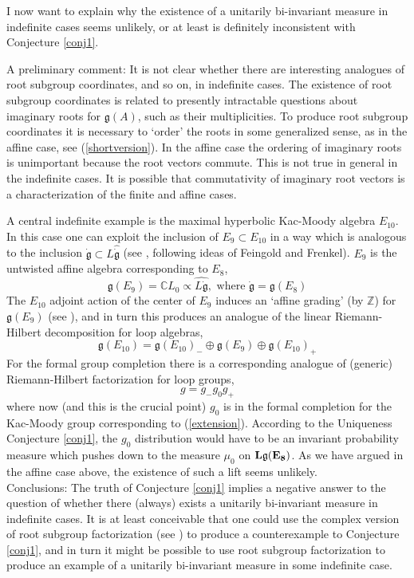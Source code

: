 \documentclass{amsart}
\theoremstyle{conjecture}
\theoremstyle{definition}
\theoremstyle{question}
\theoremstyle{questions}
\theoremstyle{remark}
\theoremstyle{remarks}
\theoremstyle{example}
\numberwithin{equation}{section}
\begin{document}
I now want to explain why the existence of a unitarily bi-invariant measure in indefinite cases seems unlikely, or at least is definitely inconsistent with Conjecture \ref{conj1}.

A preliminary comment: It is not clear whether there are interesting analogues of root subgroup coordinates, and so on, in indefinite cases. The existence of root subgroup coordinates is related to presently intractable questions about imaginary roots for $\mathfrak g(A)$, such as their multiplicities. To produce root subgroup coordinates it is necessary to `order' the roots in some generalized sense, as in the affine case, see (\ref{shortversion}). In the affine case the ordering of imaginary roots is unimportant because the root vectors commute. This is not true in general in the indefinite cases. It is possible that commutativity of imaginary root vectors is a characterization of the finite and affine cases.

A central indefinite example is the maximal hyperbolic Kac-Moody algebra $E_{10}$. In this case one can exploit the inclusion of $E_9 \subset E_{10}$
in a way which is analogous to the inclusion $\dot{\mathfrak g} \subset L\widehat{\dot{\mathfrak g}}$ (see \cite{KMW}, following ideas of Feingold and Frenkel). $E_9$ is
the untwisted affine algebra corresponding to $E_8$,
\begin{equation}\label{extension}\mathfrak g(E_9)=\mathbb CL_0 \propto \widehat{L\dot{ \mathfrak g}},\text{ where } \dot {\mathfrak g}=\mathfrak g(E_8) \end{equation}
The $E_{10}$ adjoint action of the center of $E_9$ induces an `affine grading' (by $\mathbb Z$) for $\mathfrak g(E_9)$ (see \cite{KMW}),
and in turn this produces an analogue of the linear Riemann-Hilbert decomposition for loop algebras,
$$\mathfrak g(E_{10})= \mathfrak g(E_{10})_-\oplus \mathfrak g(E_{9})\oplus\mathfrak g(E_{10})_+ $$
For the formal group completion there is a corresponding analogue of (generic) Riemann-Hilbert factorization for loop groups,
$$g=g_-g_0g_+$$
where now (and this is the crucial point) $g_0$ is in the formal completion for the Kac-Moody group corresponding to
(\ref{extension}). According to the Uniqueness Conjecture \ref{conj1}, the $g_0$ distribution would have to be an invariant probability measure which pushes down to the measure $\mu_0$ on $\bf{L} \mathfrak{g}(E_8)$. As we have argued in the affine case above, the existence of such a lift seems unlikely.\\

Conclusions: The truth of Conjecture \ref{conj1} implies a negative answer to the question of whether there (always) exists a unitarily bi-invariant measure in indefinite cases. It is at least conceivable that one could use the complex version of root subgroup factorization (see \cite{BP1}) to produce a counterexample to Conjecture \ref{conj1}, and in turn it might be possible to use root subgroup factorization to produce an example of a unitarily bi-invariant measure in some indefinite case.\\
\end{document}
